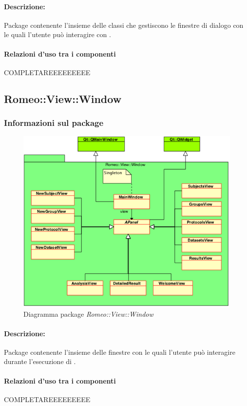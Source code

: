 			\paragraph{Descrizione:}Package\g{} contenente l'insieme delle classi che gestiscono le finestre di dialogo con le quali l'utente può interagire con \project{}.
			\paragraph{Relazioni d'uso tra i componenti}
COMPLETAREEEEEEEEE	\subsection{Romeo::View::Window}
		\subsubsection{Informazioni sul package}
			\begin{figure}[!h]
				\centering
				\includegraphics[scale=0.5]{./Content/Immagini/Window.png}
				\caption{Diagramma package \textsl{Romeo::View::Window}}
			\end{figure}
			\paragraph{Descrizione:}Package\g{} contenente l'insieme delle finestre con le quali l'utente può interagire durante l'esecuzione di \project{}.
			\paragraph{Relazioni d'uso tra i componenti}
COMPLETAREEEEEEEEE